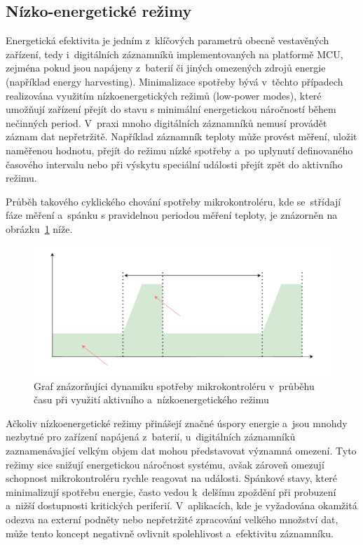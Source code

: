 \subsection{Nízko-energetické režimy}
\label{nizko_energeticke_rezimy}
Energetická efektivita je jedním z~klíčových parametrů obecně vestavěných zařízení, tedy i~digitálních záznamníků implementovaných na platformě MCU, zejména pokud jsou napájeny z~baterií či jiných omezených zdrojů energie (například energy harvesting). Minimalizace spotřeby bývá v~těchto případech realizována využitím nízkoenergetických režimů (low-power modes), které umožňují zařízení přejít do stavu s minimální energetickou náročností během nečinných period. V~praxi mnoho digitálních záznamníků nemusí provádět záznam dat nepřetržitě. Například záznamník teploty může provést měření, uložit naměřenou hodnotu, přejít do režimu nízké spotřeby a~po uplynutí definovaného časového intervalu nebo při výskytu speciální události přejít zpět do aktivního režimu.~\cite{analog_devices_low_power_modes}

Průběh takového cyklického chování spotřeby mikrokontroléru, kde se~střídají fáze měření a~spánku s pravidelnou periodou měření teploty, je znázorněn na obrázku~\ref{fig:low-power-modes} níže.

\begin{figure}[h]
    \centering
    \includegraphics[width=1.00\textwidth]{obrazky-figures/low_power_modes-cz.pdf}
    
    \caption{Graf znázorňujíci dynamiku spotřeby mikrokontroléru v~průběhu času při využití aktivního a~nízkoenergetického režimu~\cite{analog_devices_low_power_modes}}
    \label{fig:low-power-modes}
\end{figure}

Ačkoliv nízkoenergetické režimy přinášejí značné úspory energie a~jsou mnohdy nezbytné pro zařízení napájená z~baterií, u~digitálních záznamníků zaznamenávající velkým objem dat mohou představovat významná omezení. Tyto režimy sice snižují energetickou náročnost systému, avšak zároveň omezují schopnost mikrokontroléru rychle reagovat na události. Spánkové stavy, které minimalizují spotřebu energie, často vedou k~delšímu zpoždění při probuzení a~nižší dostupnosti kritických periferií. V~aplikacích, kde je vyžadována okamžitá odezva na externí podněty nebo nepřetržité zpracování velkého množství dat, může tento koncept negativně ovlivnit spolehlivost a~efektivitu záznamníku.~\cite{embedded_low_power_modes}

